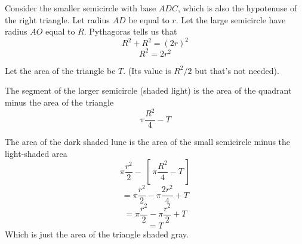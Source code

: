 \documentclass[11pt, oneside]{article}
\begin{document}
Consider the smaller semicircle with base $ADC$, which is also the hypotenuse of the right triangle.  Let radius $AD$ be equal to $r$.  Let the large semicircle have radius $AO$ equal to $R$.  Pythagoras tells us that
\[ R^2 + R^2 = (2r)^2 \]
\[ R^2 = 2r^2 \]

Let the area of the triangle be $T$.  (Its value is $R^2/2$ but that's not needed).

The segment of the larger semicircle (shaded light) is the area of the quadrant minus the area of the triangle
\[ \pi \frac{R^2}{4} -  T \]

The area of the dark shaded lune is the area of the small semicircle minus the light-shaded area
\[ \pi \frac{r^2}{2} - \ [ \ \pi \frac{R^2}{4} -  T \ ] \]
\[ = \pi \frac{r^2}{2} -  \pi \frac{2r^2}{4} + T \]
\[ = \pi \frac{r^2}{2} -  \pi \frac{r^2}{2} + T  \]
\[ = T \]
Which is just the area of the triangle shaded gray.
\end{document}
